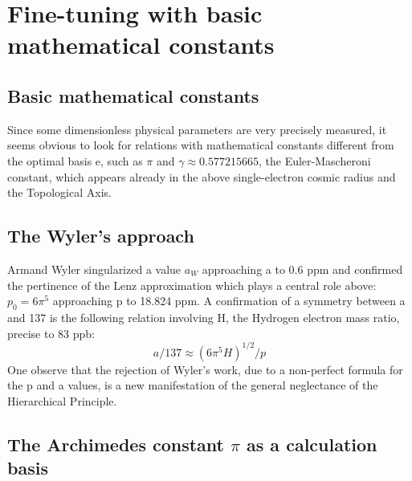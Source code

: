 \chapter{Fine-tuning with basic mathematical constants}
\label{chap:chapter_3}
\section {Basic mathematical constants}

Since some dimensionless physical parameters are very precisely measured, it seems obvious to look for
relations with mathematical constants different from the optimal basis e, such as $\pi$ and $\gamma \approx
0.577215665$, the Euler-Mascheroni constant, which appears already in the above single-electron
cosmic radius and the Topological Axis.

\section {The Wyler's approach}

Armand Wyler singularized a value $a_{W}$ approaching a to 0.6 ppm and confirmed the pertinence
of the Lenz approximation which plays a central role above: $p_{0} = 6\pi^{5}$ approaching p to 18.824 ppm.
A confirmation of a symmetry between a and 137 is the following relation involving H, the
Hydrogen electron mass ratio, precise to 83 ppb:
$$a/137 \approx (6\pi^{5} H)^{1/2} /p$$
One observe that the rejection of Wyler's work, due to a non-perfect formula for the p and a values, is a new
manifestation of the general neglectance of the Hierarchical Principle.

\section {The Archimedes constant $\pi$ as a calculation basis}

